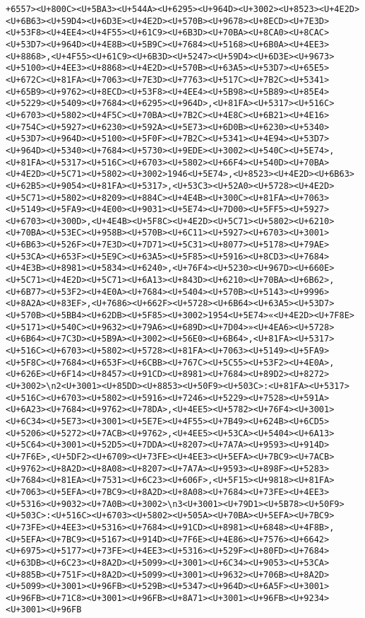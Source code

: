 \documentclass[
]{article}
\begin{document}
\begin{verbatim}
+6557><U+800C><U+5BA3><U+544A><U+6295><U+964D><U+3002><U+8523><U+4E2D><U+6B63><U+59D4><U+6D3E><U+4E2D><U+570B><U+9678><U+8ECD><U+7E3D><U+53F8><U+4EE4><U+4F55><U+61C9><U+6B3D><U+70BA><U+8CA0><U+8CAC><U+53D7><U+964D><U+4E8B><U+5B9C><U+7684><U+5168><U+6B0A><U+4EE3><U+8868>,<U+4F55><U+61C9><U+6B3D><U+5247><U+59D4><U+6D3E><U+9673><U+5100><U+4EE3><U+8868><U+4E2D><U+570B><U+63A5><U+53D7><U+65E5><U+672C><U+81FA><U+7063><U+7E3D><U+7763><U+517C><U+7B2C><U+5341><U+65B9><U+9762><U+8ECD><U+53F8><U+4EE4><U+5B98><U+5B89><U+85E4><U+5229><U+5409><U+7684><U+6295><U+964D>,<U+81FA><U+5317><U+516C><U+6703><U+5802><U+4F5C><U+70BA><U+7B2C><U+4E8C><U+6B21><U+4E16><U+754C><U+5927><U+6230><U+592A><U+5E73><U+6D0B><U+6230><U+5340><U+53D7><U+964D><U+5100><U+5F0F><U+7B2C><U+5341><U+4E94><U+53D7><U+964D><U+5340><U+7684><U+5730><U+9EDE><U+3002><U+540C><U+5E74>,<U+81FA><U+5317><U+516C><U+6703><U+5802><U+66F4><U+540D><U+70BA><U+4E2D><U+5C71><U+5802><U+3002>1946<U+5E74>,<U+8523><U+4E2D><U+6B63><U+62B5><U+9054><U+81FA><U+5317>,<U+53C3><U+52A0><U+5728><U+4E2D><U+5C71><U+5802><U+8209><U+884C><U+4E4B><U+300C><U+81FA><U+7063><U+5149><U+5FA9><U+4E00><U+9031><U+5E74><U+7D00><U+5FF5><U+5927><U+6703><U+300D>,<U+4E4B><U+5F8C><U+4E2D><U+5C71><U+5802><U+6210><U+70BA><U+53EC><U+958B><U+570B><U+6C11><U+5927><U+6703><U+3001><U+6B63><U+526F><U+7E3D><U+7D71><U+5C31><U+8077><U+5178><U+79AE><U+53CA><U+653F><U+5E9C><U+63A5><U+5F85><U+5916><U+8CD3><U+7684><U+4E3B><U+8981><U+5834><U+6240>,<U+76F4><U+5230><U+967D><U+660E><U+5C71><U+4E2D><U+5C71><U+6A13><U+843D><U+6210><U+70BA><U+6B62>,<U+6B77><U+53F2><U+4E0A><U+7684><U+5404><U+570B><U+5143><U+9996><U+8A2A><U+83EF>,<U+7686><U+662F><U+5728><U+6B64><U+63A5><U+53D7><U+570B><U+5BB4><U+62DB><U+5F85><U+3002>1954<U+5E74>«<U+4E2D><U+7F8E><U+5171><U+540C><U+9632><U+79A6><U+689D><U+7D04>»<U+4EA6><U+5728><U+6B64><U+7C3D><U+5B9A><U+3002><U+56E0><U+6B64>,<U+81FA><U+5317><U+516C><U+6703><U+5802><U+5728><U+81FA><U+7063><U+5149><U+5FA9><U+5F8C><U+7684><U+653F><U+6CBB><U+767C><U+5C55><U+53F2><U+4E0A>,<U+626E><U+6F14><U+8457><U+91CD><U+8981><U+7684><U+89D2><U+8272><U+3002>\n2<U+3001><U+85DD><U+8853><U+50F9><U+503C>:<U+81FA><U+5317><U+516C><U+6703><U+5802><U+5916><U+7246><U+5229><U+7528><U+591A><U+6A23><U+7684><U+9762><U+78DA>,<U+4EE5><U+5782><U+76F4><U+3001><U+6C34><U+5E73><U+3001><U+5E7E><U+4F55><U+7B49><U+624B><U+6CD5><U+5206><U+5272><U+7ACB><U+9762>,<U+4EE5><U+53CA><U+5404><U+6A13><U+5C64><U+3001><U+52D5><U+7DDA><U+8207><U+7A7A><U+9593><U+914D><U+7F6E>,<U+5DF2><U+6709><U+73FE><U+4EE3><U+5EFA><U+7BC9><U+7ACB><U+9762><U+8A2D><U+8A08><U+8207><U+7A7A><U+9593><U+898F><U+5283><U+7684><U+81EA><U+7531><U+6C23><U+606F>,<U+5F15><U+9818><U+81FA><U+7063><U+5EFA><U+7BC9><U+8A2D><U+8A08><U+7684><U+73FE><U+4EE3><U+5316><U+9032><U+7A0B><U+3002>\n3<U+3001><U+79D1><U+5B78><U+50F9><U+503C>:<U+516C><U+6703><U+5802><U+505A><U+70BA><U+5EFA><U+7BC9><U+73FE><U+4EE3><U+5316><U+7684><U+91CD><U+8981><U+6848><U+4F8B>,<U+5EFA><U+7BC9><U+5167><U+914D><U+7F6E><U+4E86><U+7576><U+6642><U+6975><U+5177><U+73FE><U+4EE3><U+5316><U+529F><U+80FD><U+7684><U+63DB><U+6C23><U+8A2D><U+5099><U+3001><U+6C34><U+9053><U+53CA><U+885B><U+751F><U+8A2D><U+5099><U+3001><U+9632><U+706B><U+8A2D><U+5099><U+3001><U+96FB><U+529B><U+5347><U+964D><U+6A5F><U+3001><U+96FB><U+71C8><U+3001><U+96FB><U+8A71><U+3001><U+96FB><U+9234><U+3001><U+96FB
\end{verbatim}
\end{document}
